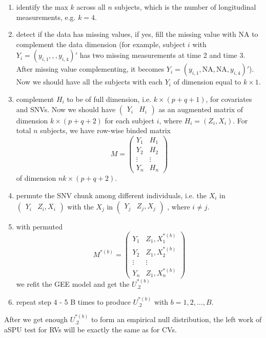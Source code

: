 \documentclass[12pt]{article}
\begin{document}
\begin{enumerate}
\item identify the max $k$ across all $n$ subjects, which is the number of longitudinal measurements, e.g. $k = 4$.
\item detect if the data has missing values, if yes, fill the missing value with NA to complement the data dimension (for example, subject $i$ with $Y_{i} = ( y_{i,1},,,y_{i,4} )'$ has two missing measurements at time 2 and time 3. After missing value complementing, it becomes $Y_{i} = ( y_{i,1},\textrm{NA},\textrm{NA},y_{i,4} )'$). Now we should have all the subjects with each $Y_{i}$ of dimension equal to $k \times 1$.  
\item complement $H_i$ to be of full dimension, i.e. $k \times (p + q + 1)$, for covariates and SNVs. Now we should have
$\begin{pmatrix}
Y_i & H_i
\end{pmatrix}$
as an augmented matrix of dimension $k \times (p + q + 2)$ for each subject $i$, where $H_i = (Z_i,X_i)$. For total $n$ subjects, we have row-wise binded matrix
$$
M = 
\begin{pmatrix}
Y_1 & H_1\\
Y_2 & H_2\\
\vdots & \vdots\\
Y_n & H_n
\end{pmatrix}
$$ 
of dimension $nk \times (p + q + 2)$.
\item permute the SNV chunk among different individuals, i.e. the $X_i$ in
$\begin{pmatrix}
Y_i & Z_i,X_i
\end{pmatrix}$ 
with the $X_j$ in 
$\begin{pmatrix}
Y_j & Z_j,X_j
\end{pmatrix}$
, where $i \neq j$. 
\item with permuted 
$$
M^{*(b)} = 
\begin{pmatrix}
Y_1 & Z_1, X_1^{*(b)}\\
Y_2 & Z_1, X_2^{*(b)}\\
\vdots & \vdots\\
Y_n & Z_1, X_n^{*(b)}
\end{pmatrix}
$$
we refit the GEE model and get the $ U_{.2}^{ *(b) } $
\item repeat step 4 - 5 B times to produce $U_{.2}^{ *(b) }$ with $b = 1,2,\ldots,B$.
\end{enumerate}
After we get enough $U_{.2}^{ *(b) }$ to form an empirical null distribution, the left work of aSPU test for RVs will be exactly the same as for CVs.



\end{document}
